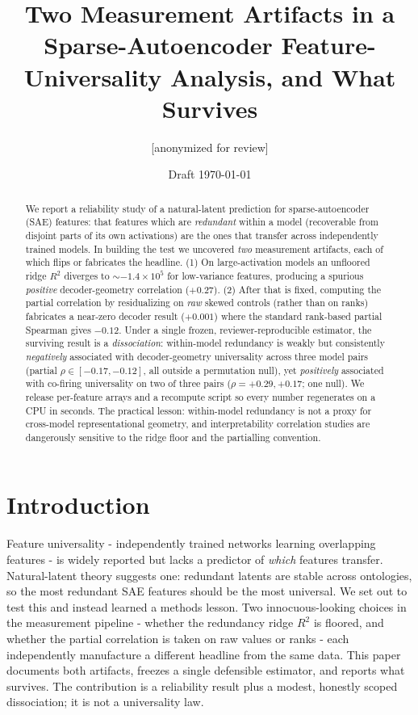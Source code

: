 \documentclass[11pt]{article}
\title{\textbf{Two Measurement Artifacts in a Sparse-Autoencoder Feature-Universality Analysis,
and What Survives}}
\author{[anonymized for review]}
\date{Draft \today}
\begin{document}
\maketitle

\begin{abstract}
We report a reliability study of a natural-latent prediction for sparse-autoencoder (SAE) features: that
features which are \emph{redundant} within a model (recoverable from disjoint parts of its own
activations) are the ones that transfer across independently trained models. In building the test we
uncovered \emph{two} measurement artifacts, each of which flips or fabricates the headline. (1) On
large-activation models an unfloored ridge $R^2$ diverges to $\sim{-}1.4\times10^{5}$ for low-variance
features, producing a spurious \emph{positive} decoder-geometry correlation ($+0.27$). (2) After that is
fixed, computing the partial correlation by residualizing on \emph{raw} skewed controls (rather than on
ranks) fabricates a near-zero decoder result ($+0.001$) where the standard rank-based partial Spearman
gives $-0.12$. Under a single frozen, reviewer-reproducible estimator, the surviving result is a
\emph{dissociation}: within-model redundancy is weakly but consistently \emph{negatively} associated with
decoder-geometry universality across three model pairs (partial $\rho\in[-0.17,-0.12]$, all outside a
permutation null), yet \emph{positively} associated with co-firing universality on two of three pairs
($\rho=+0.29,+0.17$; one null). We release per-feature arrays and a recompute script so every number
regenerates on a CPU in seconds. The practical lesson: within-model redundancy is not a proxy for
cross-model representational geometry, and interpretability correlation studies are dangerously sensitive
to the ridge floor and the partialling convention.
\end{abstract}

\section{Introduction}
Feature universality - independently trained networks learning overlapping features - is widely reported
but lacks a predictor of \emph{which} features transfer. Natural-latent theory suggests one: redundant
latents are stable across ontologies, so the most redundant SAE features should be the most universal.
We set out to test this and instead learned a methods lesson. Two innocuous-looking choices in the
measurement pipeline - whether the redundancy ridge $R^2$ is floored, and whether the partial correlation
is taken on raw values or ranks - each independently manufacture a different headline from the same data.
This paper documents both artifacts, freezes a single defensible estimator, and reports what survives.
The contribution is a reliability result plus a modest, honestly scoped dissociation; it is not a
universality law.
\end{document}
